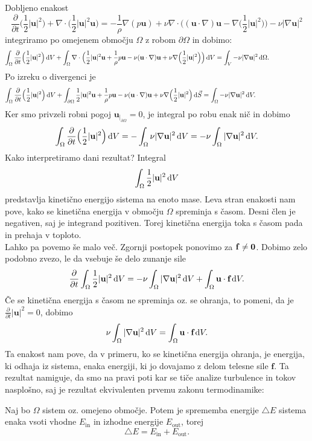\documentclass[mat2, tisk]{fmfdelo}
\newcommand{\bd}{\textbf}
\begin{document}
Dobljeno enakost 
$$
\frac{\partial}{\partial t} \Big(\frac{1}{2} |\bd{u}|^2 \Big) + \nabla \cdot \Big(\frac{1}{2} |\bd{u}|^2 \bd{u}\Big) = 
-\frac{1}{\rho}\nabla(p \bd{u}) + \nu \nabla\cdot\Big((\bd{u}\cdot \nabla)\bd{u} - \nabla\Big(\frac{1}{2} |\bd{u}|^2\Big)\Big) - \nu|\nabla \bd{u}|^2
$$
integriramo po omejenem območju $\Omega$ z robom $\partial \Omega$ in dobimo:
\begin{align*}
\int_\Omega \frac{\partial}{\partial t} \Big(\frac{1}{2} |\bd{u}|^2 \Big)\dif V + \int_\Omega \nabla \cdot\Big(\frac{1}{2} |\bd{u}|^2 \bd{u}+\frac{1}{\rho}p \bd{u} - \nu(\bd{u}\cdot \nabla)\bd{u} + \nu\nabla\Big(\frac{1}{2} |\bd{u}|^2\Big)\Big)\dif V =\int_V - \nu|\nabla \bd{u}|^2 \dif \Omega.\qquad\qquad\qquad
\end{align*}
Po izreku o divergenci je
\begin{align*}
  \int_\Omega \frac{\partial}{\partial t} \Big(\frac{1}{2} |\bd{u}|^2 \Big)\dif V + \int_{\partial\Omega} \frac{1}{2} |\bd{u}|^2 \bd{u}
  +\frac{1}{\rho}p \bd{u} - \nu(\bd{u}\cdot \nabla)\bd{u} + \nu\nabla\Big(\frac{1}{2} |\bd{u}|^2\Big)\dif \vec{S} =\int_\Omega - \nu|\nabla \bd{u}|^2 \dif V.\qquad\qquad\qquad\qquad
\end{align*}
Ker smo privzeli robni pogoj $\bd{u}_{|_{\partial\Omega}} = 0$, je integral po robu enak nič in dobimo
$$
\int_\Omega \frac{\partial}{\partial t} \Big(\frac{1}{2} |\bd{u}|^2 \Big)\dif V = - \int_\Omega\nu|\nabla \bd{u}|^2 \dif V =  - \nu\int_\Omega |\nabla \bd{u}|^2 \dif V.
$$
Kako interpretiramo dani rezultat? Integral 
$$
\int_\Omega \frac{1}{2} |\bd{u}|^2 \dif V
$$
predstavlja kinetično energijo sistema na enoto mase.
Leva stran enakosti nam pove, kako se kinetična energija 
v območju $\Omega$ spreminja s časom. Desni člen je negativen, saj je integrand pozitiven.
Torej kinetična energija toka s časom pada in prehaja v toploto.\\
Lahko pa povemo še malo več. Zgornji postopek ponovimo za $\bf{f} \neq 0$. 
Dobimo zelo podobno zvezo, le da vsebuje še delo zunanje sile
\begin{equation*}
\frac{\partial}{\partial t}\int_\Omega \frac{1}{2} |\bd{u}|^2 \dif V = - \nu\int_\Omega |\nabla \bd{u}|^2 \dif V + \int_\Omega \bd{u}\cdot \bd{f} \dif V.
\end{equation*}
Če se kinetična energija s časom ne spreminja oz. se ohranja, to pomeni, da je  $\frac{\partial}{\partial t} |\bd{u}|^2 = 0$, dobimo
$$
 \nu\int_\Omega |\nabla \bd{u}|^2 \dif V = \int_\Omega \bd{u}\cdot \bd{f} \dif V.
$$
Ta enakost nam pove, da v primeru, ko se kinetična energija ohranja, je energija, ki odhaja iz sistema, enaka energiji, ki jo dovajamo z delom telesne sile $\bd{f}$.
Ta rezultat namiguje, da smo na pravi poti kar se tiče analize turbulence in tokov
nasplošno, saj je rezultat ekvivalenten prvemu zakonu termodinamike:
\begin{definicija}
Naj bo $\Omega$ sistem oz. omejeno območje. Potem je sprememba energije $\triangle E$ sistema 
enaka vsoti vhodne $E_\text{in}$ in izhodne energije $E_{\text{out}}$, torej
\begin{equation*}
\triangle E = E_\text{in} + E_{\text{out}}.
\end{equation*}
\end{definicija}
\end{document}
